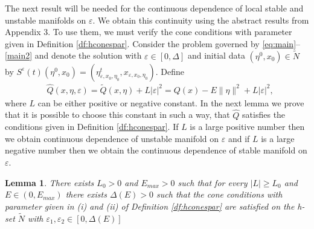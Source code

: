 \documentclass[11pt, leqno]{amsart}
\newtheorem{lem}[thm]{Lemma}
\theoremstyle{definition}
\begin{document}
The next result will be needed for the continuous dependence of local stable and unstable manifolds on $\varepsilon$. We obtain this continuity using the abstract results from Appendix 3. To use them, we must verify  the cone conditions with parameter given in Definition \ref{df:hconespar}. Consider the problem governed by \eqref{eq:main}--\eqref{main2} and
denote the solution with $\varepsilon \in [0,\Delta]$ and initial data $ (\eta^0,x_0) \in \widetilde{N}$ by $S^\varepsilon(t)(\eta^0,x_0)=(\eta^t_{\varepsilon,x_0,\eta_0},x_{\varepsilon,x_0,\eta_0})$.
Define
\begin{align*}
& \widehat{Q}(x,\eta,\varepsilon) = \widetilde{Q}(x,\eta) + L|\varepsilon|^2 = {Q}(x) - E\|\eta\|^2 + L|\varepsilon|^2,
\end{align*}
where $L$ can be either positive or negative constant. In the next lemma we prove that it is possible to choose this constant in such a way, that $\widehat{Q}$ satisfies the conditions given in Definition \ref{df:hconespar}. If $L$ is a large positive number then we obtain continuous dependence of unstable manifold on $\varepsilon$ and if $L$ is a large negative number then we obtain the continuous dependence of stable manifold on $\varepsilon$.
\begin{lem}\label{lem:cone:par}
	There exists $L_0>0$ and $E_{max}>0$ such that for every $|L|\geq L_0$ and $E\in (0,E_{max})$ there exists $\Delta(E) > 0$ such that the cone conditions with parameter given in (i) and (ii) of Definition \ref{df:hconespar} are satisfied on the h-set $\widetilde{N}$ with $\varepsilon_1,\varepsilon_2 \in [0,\Delta(E)]$
\end{lem}
\end{document}
